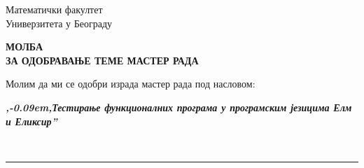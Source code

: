 \documentclass[a4paper]{article}
\def\zn{,\kern-0.09em,}
\begin{document}
\thispagestyle{empty}

\begin{flushleft}
Математички факултет\\
Универзитета у Београду
\end{flushleft}

\bigskip

\begin{center}
\textbf{МОЛБА\\
ЗА ОДОБРАВАЊЕ ТЕМЕ МАСТЕР РАДА
}\end{center}

\bigskip

\begin{flushleft}
Молим да ми се одобри израда мастер рада под насловом:
\end{flushleft}

\begin{minipage}{16.5cm}
\textbf{\textit{\zn Тестирање функционалних програма у програмским језицима Елм и Еликсир''}}
\end{minipage}\\
\rule[4mm]{17.5cm}{.05mm}
\end{document}
